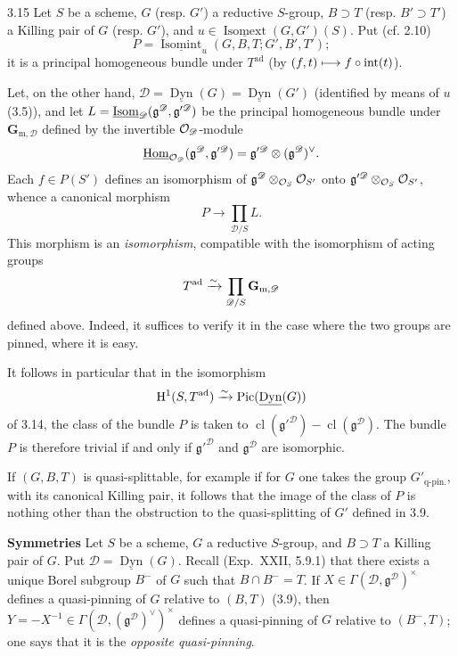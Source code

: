 \begin{remark}{3.15}\label{XXIV.3.15}
Let $S$ be a scheme, $G$ (resp. $G'$) a reductive $S$-group, $B\supset T$ (resp. $B'\supset T'$) a Killing pair of $G$ (resp. $G'$), and $u\in\underline{\operatorname{Isomext}}(G,G')(S)$. Put (cf. 2.10)
\[
P=\underline{\operatorname{Isomint}}_u(G,B,T;G',B',T');
\]
it is a principal homogeneous bundle under $T^{\mathrm{ad}}$ (by $(f,t)\longmapsto f\circ\mathrm{int}(t)$).

Let, on the other hand, $\mathscr D=\underline{\operatorname{Dyn}}(G)=\underline{\operatorname{Dyn}}(G')$ (identified by means of $u$ (3.5)), and let $L=\underline{\operatorname{Isom}}_{\mathscr D}(\mathfrak g^{\mathscr D},\mathfrak g'^{\mathscr D})$ be the principal homogeneous bundle under $\mathbf G_{\mathrm m,\mathscr D}$ defined by the invertible $\mathcal{O}_{\mathscr D}$-module
\[
\underline{\operatorname{Hom}}_{\mathcal{O}_{\mathscr D}}(\mathfrak g^{\mathscr D},\mathfrak g'^{\mathscr D})=\mathfrak g'^{\mathscr D}\otimes(\mathfrak g^{\mathscr D})^\vee.
\]
Each $f\in P(S')$ defines an isomorphism of $\mathfrak g^{\mathscr D}\otimes_{\mathcal{O}_S}\mathcal{O}_{S'}$ onto $\mathfrak g'^{\mathscr D}\otimes_{\mathcal{O}_S}\mathcal{O}_{S'}$, whence a canonical morphism
\[
P\to\prod_{\mathscr D/S}L.
\]
This morphism is an \emph{isomorphism}, compatible with the isomorphism of acting groups
\[
T^{\mathrm{ad}}\xrightarrow{\sim}\prod_{\mathscr D/S}\mathbf G_{\mathrm m,\mathscr D}
\]
defined above.
Indeed, it suffices to verify it in the case where the two groups are pinned, where it is easy.

It follows in particular that in the isomorphism
\[
\mathrm H^1(S,T^{\mathrm{ad}})\xrightarrow{\sim}\operatorname{Pic}(\underline{\operatorname{Dyn}}(G))
\]
of 3.14, the class of the bundle $P$ is taken to $\operatorname{cl}(\mathfrak g'^{\mathscr D})-\operatorname{cl}(\mathfrak g^{\mathscr D})$. The bundle $P$ is therefore trivial if and only if $\mathfrak g'^{\mathscr D}$ and $\mathfrak g^{\mathscr D}$ are isomorphic.

If $(G,B,T)$ is quasi-splittable, for example if for $G$ one takes the group $G'_{\text{q-pin.}}$, with its canonical Killing pair, it follows that the image of the class of $P$ is nothing other than the obstruction to the quasi-splitting of $G'$ defined in 3.9.
\end{remark}
\label{XXIV.3.16}\textbf{Symmetries}
\label{XXIV.3.16.1}
Let $S$ be a scheme, $G$ a reductive $S$-group, and $B\supset T$ a Killing pair of $G$. Put $\mathscr D=\underline{\operatorname{Dyn}}(G)$. Recall (Exp.~XXII, 5.9.1) that there exists a unique Borel subgroup $B^-$ of $G$ such that $B\cap B^-=T$. If $X\in\Gamma(\mathscr D,\mathfrak g^{\mathscr D})^\times$ defines a quasi-pinning of $G$ relative to $(B,T)$ (3.9), then $Y=-X^{-1}\in\Gamma(\mathscr D,(\mathfrak g^{\mathscr D})^\vee)^\times$ defines a quasi-pinning of $G$ relative to $(B^-,T)$; one says that it is the \emph{opposite quasi-pinning}.

